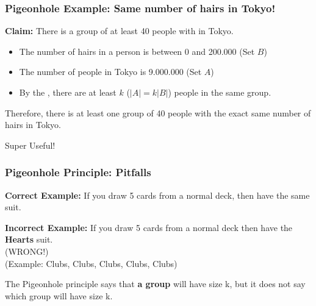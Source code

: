 \documentclass{beamer}
\begin{document}
\begin{frame}
  \frametitle{Pigeonhole Example: Same number of hairs in Tokyo!}

  {\larger

    {\bf Claim:} There is a group of \alert{at least 40 people} with
     in Tokyo.

    \bigskip

    \begin{itemize}
    \item The number of hairs in a person is between 0 and 200.000 (Set $B$)
    \item The number of people in Tokyo is 9.000.000 (Set $A$)
    \item By the , there are at least
      $k$ ($|A|= k|B|$) people in the same group.
    \end{itemize}

    \bigskip

    Therefore, there is \alert{at least one group of 40 people} with
    the exact same number of hairs in Tokyo.

    \vfill

    \begin{center}
      Super Useful!
    \end{center}    
  }
\end{frame}

\begin{frame}
  \frametitle{Pigeonhole Principle: Pitfalls}

  {\larger

    {\bf Correct Example:} If you draw 5 cards from a normal deck,
    then  have the same suit.

    \bigskip
    
    {\bf Incorrect Example:} If you draw 5 cards from a normal deck
    then  have the {\bf Hearts} suit.\\
    \hfill(\alert{WRONG!})\\
    \hfill(Example: Clubs, Clubs, Clubs, Clubs, Clubs)

    \vfill

    The Pigeonhole principle says that {\bf a group} will have size k,
    but it does not say \alert{which group} will have size k.
  }  
\end{frame}
\end{document}

